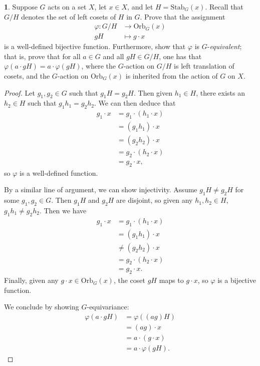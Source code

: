 \documentclass[12pt]{article}
\theoremstyle{definition}
\newtheorem{ex}{}
\begin{document}
\begin{ex}
	Suppose $G$ acts on a set $X$, let $x \in X$, and let $H = \mathrm{Stab}_G(x)$.
	Recall that $G/H$ denotes the set of left cosets of $H$ in $G$.
	Prove that the assignment \begin{align*}
		\varphi: G/H & \to \mathrm{Orb}_G(x) \\
		gH           & \mapsto g\cdot x
	\end{align*}
	is a well-defined bijective function.
	Furthermore, show that $\varphi$ is $G$-\textit{equivalent}; that is, prove that for all $a \in G$ and all $gH \in G/H$, one has that $\varphi(a \cdot gH) = a \cdot \varphi(gH)$, where the $G$-action on $G/H$ is left translation of cosets, and the $G$-action on $\mathrm{Orb}_G(x)$ is inherited from the action of $G$ on $X$.
\end{ex}
\begin{proof}
	Let $g_1, g_2 \in G$ such that $g_1H = g_2H$.
	Then given $h_1 \in H$, there exists an $h_2 \in H$ such that $g_1h_1 = g_2h_2$.
	We can then deduce that \begin{align*}
		g_1 \cdot x & = g_1 \cdot (h_1 \cdot x) \\
		            & = (g_1h_1) \cdot x        \\
		            & = (g_2h_2) \cdot x        \\
		            & = g_2 \cdot (h_2 \cdot x) \\
		            & = g_2 \cdot x,
	\end{align*}
	so $\varphi$ is a well-defined function.

	By a similar line of argument, we can show injectivity.
	Assume $g_1H \neq g_2H$ for some $g_1, g_2 \in G$.
	Then $g_1H$ and $g_2H$ are disjoint, so given any $h_1, h_2 \in H$, $g_1h_1 \neq g_2h_2$.
	Then we have \begin{align*}
		g_1 \cdot x & = g_1 \cdot (h_1 \cdot x) \\
		            & = (g_1h_1) \cdot x        \\
		            & \neq (g_2h_2) \cdot x     \\
		            & = g_2 \cdot (h_2 \cdot x) \\
		            & = g_2 \cdot x.
	\end{align*}
	Finally, given any $g \cdot x \in \mathrm{Orb}_G(x)$, the coset $gH$ maps to $g\cdot x$, so $\varphi$ is a bijective function.

	We conclude by showing $G$-equivariance: \begin{align*}
		\varphi(a \cdot gH) & = \varphi((ag)H) \\
                        & = (ag) \cdot x \\
                        & = a \cdot (g \cdot x) \\
                        & = a \cdot \varphi(gH).
	\end{align*}
\end{proof}
\end{document}
